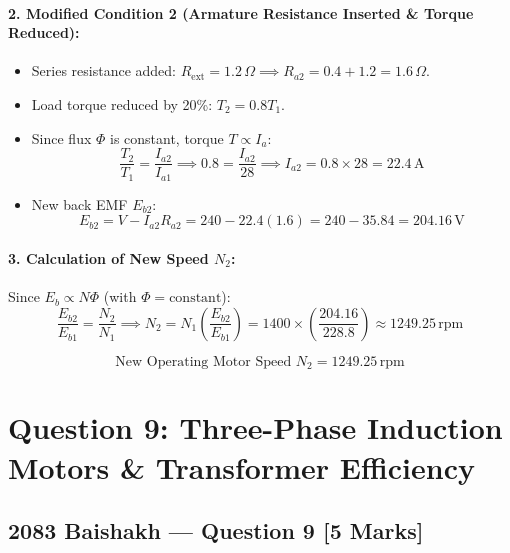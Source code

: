 \documentclass[11pt,a4paper,oneside]{article}
\begin{document}
\paragraph{2. Modified Condition 2 (Armature Resistance Inserted \& Torque Reduced):}
\begin{itemize}[leftmargin=1.5em]
  \item Series resistance added: $R_{\text{ext}} = 1.2\,\Omega \implies R_{a2} = 0.4 + 1.2 = 1.6\,\Omega$.
  \item Load torque reduced by 20\%: $T_2 = 0.8 T_1$.
  \item Since flux $\Phi$ is constant, torque $T \propto I_a$:
  \[
  \frac{T_2}{T_1} = \frac{I_{a2}}{I_{a1}} \implies 0.8 = \frac{I_{a2}}{28} \implies I_{a2} = 0.8 \times 28 = 22.4\,\mathrm{A}
  \]
  \item New back EMF $E_{b2}$:
  \[
  E_{b2} = V - I_{a2} R_{a2} = 240 - 22.4(1.6) = 240 - 35.84 = 204.16\,\mathrm{V}
  \]
\end{itemize}

\paragraph{3. Calculation of New Speed $N_2$:}
Since $E_b \propto N \Phi$ (with $\Phi = \text{constant}$):
\begin{equation}
  \frac{E_{b2}}{E_{b1}} = \frac{N_2}{N_1} \implies N_2 = N_1 \left(\frac{E_{b2}}{E_{b1}}\right) = 1400 \times \left(\frac{204.16}{228.8}\right) \approx 1249.25\,\mathrm{rpm}
\end{equation}

\begin{answerbox}
\[
\text{New Operating Motor Speed } N_2 = 1249.25\,\mathrm{rpm}
\]
\end{answerbox}

\newpage

\section{Question 9: Three-Phase Induction Motors \& Transformer Efficiency}

\subsection{2083 Baishakh --- Question 9 [5 Marks]}
\end{document}
